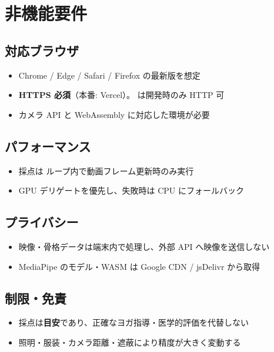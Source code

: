 \documentclass[a4paper,11pt]{ltjsarticle}
\begin{document}
\section{非機能要件}

\subsection{対応ブラウザ}

\begin{itemize}
  \item Chrome / Edge / Safari / Firefox の最新版を想定
  \item \textbf{HTTPS 必須}（本番: Vercel）。 は開発時のみ HTTP 可
  \item カメラ API と WebAssembly に対応した環境が必要
\end{itemize}

\subsection{パフォーマンス}

\begin{itemize}
  \item 採点は  ループ内で動画フレーム更新時のみ実行
  \item GPU デリゲートを優先し、失敗時は CPU にフォールバック
\end{itemize}

\subsection{プライバシー}

\begin{itemize}
  \item 映像・骨格データは端末内で処理し、外部 API へ映像を送信しない
  \item MediaPipe のモデル・WASM は Google CDN / jsDelivr から取得
\end{itemize}

\subsection{制限・免責}

\begin{itemize}
  \item 採点は\textbf{目安}であり、正確なヨガ指導・医学的評価を代替しない
  \item 照明・服装・カメラ距離・遮蔽により精度が大きく変動する
\end{itemize}
\end{document}
